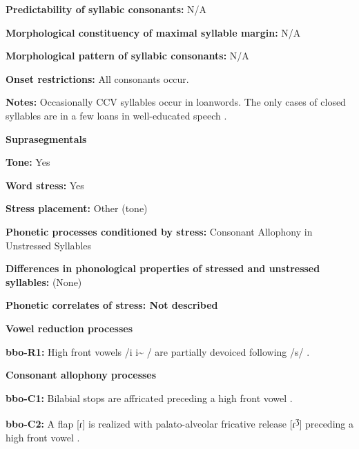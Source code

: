 \textbf{Predictability of syllabic consonants:} N/A



\textbf{Morphological constituency of maximal syllable margin:} N/A



\textbf{Morphological pattern of syllabic consonants:} N/A



\textbf{Onset restrictions:} All consonants occur.



\textbf{Notes:} Occasionally CCV syllables occur in loanwords. The only cases of closed syllables are in a few  loans in well-educated speech \citep[113]{Morse1976}.



\textbf{Suprasegmentals}



\textbf{Tone:} Yes



\textbf{Word stress:} Yes



\textbf{Stress placement:} Other (tone)



\textbf{Phonetic processes conditioned by stress:} Consonant Allophony in Unstressed Syllables



\textbf{Differences in phonological properties of stressed and unstressed syllables:} (None)



\textbf{Phonetic correlates of stress: Not described}



\textbf{Vowel reduction processes}



\textbf{bbo-R1:} High front vowels /i i\~{} / are partially devoiced following /s/ \citep[28-9]{Morse1976}.



\textbf{Consonant allophony processes}



\textbf{bbo-C1:} Bilabial stops are affricated preceding a high front vowel \citep[20]{Morse1976}.



\textbf{bbo-C2:} A flap [ɾ] is realized with palato-alveolar fricative release [ɾ\textsuperscript{ʒ}] preceding a high front vowel \citep[25]{Morse1976}.



